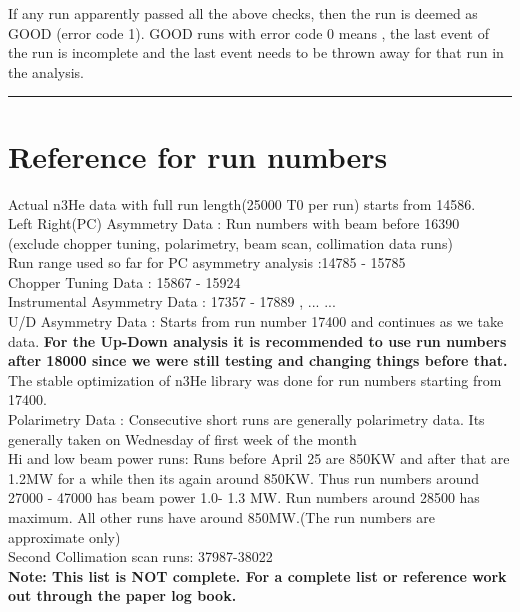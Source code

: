 \documentclass[12pt]{article}
\begin{document}
If any run apparently passed all the above checks, then the run is deemed as GOOD (error code 1). GOOD runs with error code 0 means , the last event of the run is incomplete and the last event needs to be thrown away for that run in the analysis.
 
\noindent
{\color{red} \rule{\linewidth}{1mm} }


\newpage
\section{Reference for run numbers}
Actual n3He data with full run length(25000 T0 per run) starts from 14586. \\

Left Right(PC) Asymmetry Data : Run numbers with beam before 16390 (exclude chopper tuning, polarimetry, beam scan, collimation data runs)\\

Run range used so far for PC asymmetry analysis :14785 - 15785  \\

Chopper Tuning Data : 15867 - 15924 \\

Instrumental Asymmetry Data : 17357 - 17889 , ... ... \\

U/D Asymmetry Data : Starts from run number 17400 and continues as we take data. \textbf {For the Up-Down analysis it is recommended to use run numbers after 18000 since we were still testing and changing things before that.}\\

The stable optimization of n3He library was done for run numbers starting from 17400. \\
  
Polarimetry Data : Consecutive short runs are generally polarimetry data. Its generally taken on Wednesday of first week of the month\\

Hi and low beam power runs: Runs before April 25 are 850KW and after that are 1.2MW for a while then its again around 850KW. Thus run numbers around 27000 - 47000 has beam power 1.0- 1.3 MW. Run numbers around 28500 has maximum. All other runs have around 850MW.(The run numbers are approximate only) \\

Second Collimation scan runs: 37987-38022 \\
 
\textbf{ Note: This list is NOT complete. For a complete list or reference work out through the paper log book.} \\
\end{document}
